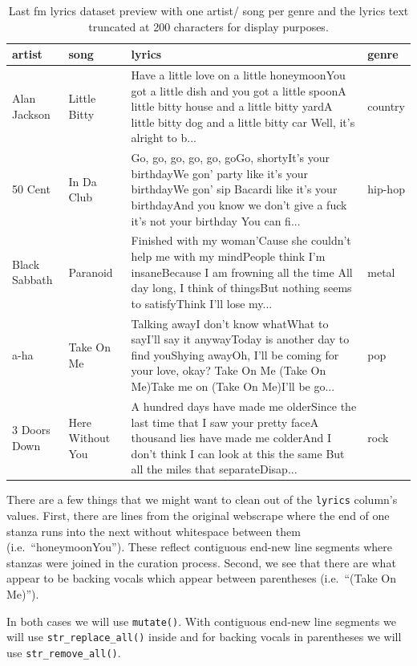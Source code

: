 \documentclass[
  letterpaper,
]{latex/krantz}
\begin{document}
\hypertarget{tbl-td-lastfm-read-preview}{}
\begin{table}
\caption{\label{tbl-td-lastfm-read-preview}Last fm lyrics dataset preview with one artist/ song per genre and the
lyrics text truncated at 200 characters for display purposes. }\tabularnewline

\centering
\begin{tabular}{llll}
\toprule
artist & song & lyrics & genre\\
\midrule
Alan Jackson & Little Bitty & Have a little love on a little honeymoonYou got a little dish and you got a little spoonA little bitty house and a little bitty yardA little bitty dog and a little bitty car Well, it's alright to b... & country\\
50 Cent & In Da Club & Go, go, go, go, go, goGo, shortyIt's your birthdayWe gon' party like it's your birthdayWe gon' sip Bacardi like it's your birthdayAnd you know we don't give a fuck it's not your birthday You can fi... & hip-hop\\
Black Sabbath & Paranoid & Finished with my woman'Cause she couldn't help me with my mindPeople think I'm insaneBecause I am frowning all the time All day long, I think of thingsBut nothing seems to satisfyThink I'll lose my... & metal\\
a-ha & Take On Me & Talking awayI don't know whatWhat to sayI'll say it anywayToday is another day to find youShying awayOh, I'll be coming for your love, okay? Take On Me (Take On Me)Take me on (Take On Me)I'll be go... & pop\\
3 Doors Down & Here Without You & A hundred days have made me olderSince the last time that I saw your pretty faceA thousand lies have made me colderAnd I don't think I can look at this the same But all the miles that separateDisap... & rock\\
\bottomrule
\end{tabular}
\end{table}

There are a few things that we might want to clean out of the
\texttt{lyrics} column's values. First, there are lines from the
original webscrape where the end of one stanza runs into the next
without whitespace between them (i.e.~``honeymoonYou''). These reflect
contiguous end-new line segments where stanzas were joined in the
curation process. Second, we see that there are what appear to be
backing vocals which appear between parentheses (i.e.~``(Take On Me)'').

In both cases we will use \texttt{mutate()}. With contiguous end-new
line segments we will use \texttt{str\_replace\_all()} inside and for
backing vocals in parentheses we will use \texttt{str\_remove\_all()}.
\end{document}
